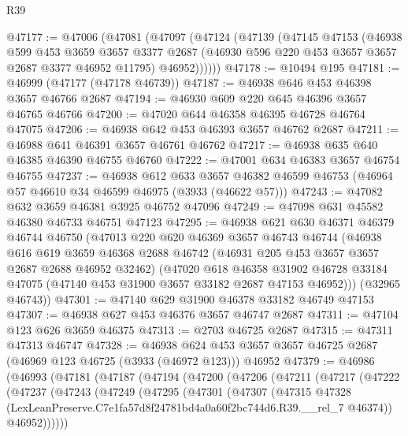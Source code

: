 \begin{lexlean}{R39}
\begin{coremodule}
@47177 := @47006
    (@47081
      (@47097
        (@47124
          (@47139
            (@47145
              @47153
              (@46938
                @599
                @453
                @3659
                @3657
                @3377
                @2687
                (@46930 @596 @220 @453 @3657 @3657 @2687 @3377 @46952 @11795)
                @46952))))))
@47178 := @10494 @195
@47181 := @46999 (@47177 (@47178 @46739))
@47187 := @46938 @646 @453 @46398 @3657 @46766 @2687
@47194 := @46930 @609 @220 @645 @46396 @3657 @46765 @46766
@47200 := @47020 @644 @46358 @46395 @46728 @46764 @47075
@47206 := @46938 @642 @453 @46393 @3657 @46762 @2687
@47211 := @46988 @641 @46391 @3657 @46761 @46762
@47217 := @46938 @635 @640 @46385 @46390 @46755 @46760
@47222 := @47001 @634 @46383 @3657 @46754 @46755
@47237 := @46938
    @612
    @633
    @3657
    @46382
    @46599
    @46753
    (@46964 @57 @46610 @34 @46599 @46975 (@3933 (@46622 @57)))
@47243 := @47082 @632 @3659 @46381 @3925 @46752 @47096
@47249 := @47098 @631 @45582 @46380 @46733 @46751 @47123
@47295 := @46938
    @621
    @630
    @46371
    @46379
    @46744
    @46750
    (@47013
      @220
      @620
      @46369
      @3657
      @46743
      @46744
      (@46938
        @616
        @619
        @3659
        @46368
        @2688
        @46742
        (@46931 @205 @453 @3657 @3657 @2687 @2688 @46952 @32462)
        (@47020
          @618
          @46358
          @31902
          @46728
          @33184
          @47075
          (@47140 @453 @31900 @3657 @33182 @2687 @47153 @46952)))
      (@32965 @46743))
@47301 := @47140 @629 @31900 @46378 @33182 @46749 @47153
@47307 := @46938 @627 @453 @46376 @3657 @46747 @2687
@47311 := @47104 @123 @626 @3659 @46375
@47313 := @2703 @46725 @2687
@47315 := @47311 @47313 @46747
@47328 := @46938
    @624
    @453
    @3657
    @3657
    @46725
    @2687
    (@46969 @123 @46725 (@3933 (@46972 @123)))
    @46952
@47379 := @46986
    (@46993
      (@47181
        (@47187
          (@47194
            (@47200
              (@47206
                (@47211
                  (@47217
                    (@47222
                      (@47237
                        (@47243
                          (@47249
                            (@47295
                              (@47301
                                (@47307
                                  (@47315
                                    @47328
                                    (LexLeanPreserve.C7e1fa57d8f24781bd4a0a60f2bc744d6.R39.__rel_7
                                      @46374))
                                  @46952))))))

\end{coremodule}
\end{lexlean}

